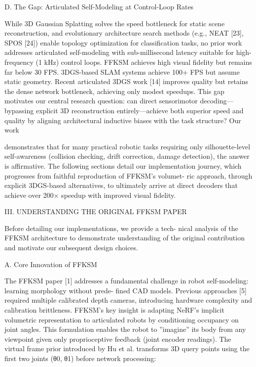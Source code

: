 \documentclass[10pt,twocolumn,letterpaper]{article}
\begin{document}
D. The Gap: Articulated Self-Modeling at Control-Loop Rates

While 3D Gaussian Splatting solves the speed bottleneck for static scene reconstruction, and evolutionary architecture search methods (e.g., NEAT [23], SPOS [24]) enable topology optimization for classification tasks, no prior work addresses articulated self-modeling with sub-millisecond latency suitable for high-frequency (1 kHz) control loops. FFKSM achieves high visual fidelity but remains far below 30 FPS. 3DGS-based SLAM systems achieve 100+ FPS but assume static geometry. Recent articulated 3DGS work [14] improves quality but retains the dense network bottleneck, achieving only modest speedups. This gap motivates our central research question: can direct sensorimotor decoding—bypassing explicit 3D reconstruction entirely—achieve both superior speed and quality by aligning architectural inductive biases with the task structure? Our work

demonstrates that for many practical robotic tasks requiring only silhouette-level self-awareness (collision checking, drift correction, damage detection), the answer is affirmative. The following sections detail our implementation journey, which progresses from faithful reproduction of FFKSM’s volumet- ric approach, through explicit 3DGS-based alternatives, to ultimately arrive at direct decoders that achieve over 200× speedup with improved visual fidelity.

III. UNDERSTANDING THE ORIGINAL FFKSM PAPER

Before detailing our implementations, we provide a tech- nical analysis of the FFKSM architecture to demonstrate understanding of the original contribution and motivate our subsequent design choices.

A. Core Innovation of FFKSM

The FFKSM paper [1] addresses a fundamental challenge in robot self-modeling: learning morphology without prede- fined CAD models. Previous approaches [5] required multiple calibrated depth cameras, introducing hardware complexity and calibration brittleness. FFKSM’s key insight is adapting NeRF’s implicit volumetric representation to articulated robots by conditioning occupancy on joint angles. This formulation enables the robot to ”imagine” its body from any viewpoint given only proprioceptive feedback (joint encoder readings). The virtual frame prior introduced by Hu et al. transforms 3D query points using the first two joints (θ0, θ1) before network processing:
\end{document}
